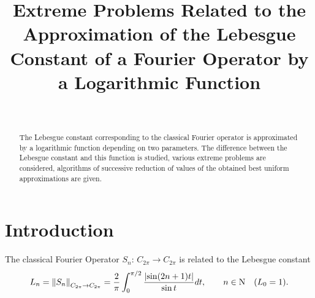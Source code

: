 \documentclass[
11pt,%
tightenlines,%
twoside,%
onecolumn,%
nofloats,%
nobibnotes,%
nofootinbib,%
superscriptaddress,%
noshowpacs,%
centertags]%
{revtex4}
\begin{document}
\titlerunning{} %

\title{Extreme Problems Related to the Approximation of the Lebesgue Constant of a Fourier Operator by a Logarithmic Function}

\author{~}






\received{} %


\begin{abstract} %
The Lebesgue constant corresponding to the classical Fourier operator is approximated by a logarithmic function depending on two parameters. The difference between the Lebesgue constant and this function is studied, various extreme problems are considered, algorithms of successive reduction of values of the obtained best uniform approximations are given.
\end{abstract}

\maketitle


\section{Introduction}

The classical Fourier Operator $S_{n}:\,  C_{2\pi }  \to   C_{2\pi } $
is related to the Lebesgue constant
\begin{equation}\label{GrindEQ__1_}
L_{n}   =\left\| S_{n} \right\| _{C_{2\pi } \to C_{2\pi } }   =\frac{2}{\pi } \int _{  0}^{  \pi /2} \frac{\left|\sin (2n+1)t\right|}{\sin t}  dt,  \qquad       n\in {\rm N}     \quad          (L_{0} =1  ).
\end{equation}
\end{document}
